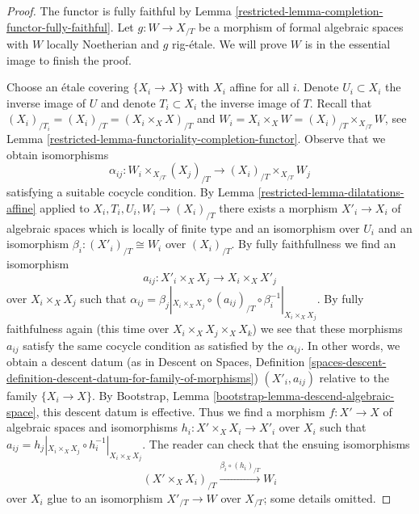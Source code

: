 \begin{proof}

The functor is fully faithful by
Lemma \ref{restricted-lemma-completion-functor-fully-faithful}.
Let $g : W \to X_{/T}$ be a morphism of formal algebraic spaces
with $W$ locally Noetherian and $g$ rig-\'etale.
We will prove $W$ is in the essential image to finish the proof.

\medskip\noindent
Choose an \'etale covering $\{X_i \to X\}$ with $X_i$ affine for all $i$.
Denote $U_i \subset X_i$ the inverse image of $U$ and denote
$T_i \subset X_i$ the inverse image of $T$.
Recall that $(X_i)_{/T_i} = (X_i)_{/T} = (X_i \times_X X)_{/T}$ and
$W_i = X_i \times_X W = (X_i)_{/T} \times_{X_{/T}} W$, see
Lemma \ref{restricted-lemma-functoriality-completion-functor}.
Observe that we obtain isomorphisms
$$
\alpha_{ij} :
W_i \times_{X_{/T}} (X_j)_{/T}
\longrightarrow
(X_i)_{/T} \times_{X_{/T}} W_j
$$
satisfying a suitable cocycle condition.
By Lemma \ref{restricted-lemma-dilatations-affine} applied to
$X_i, T_i, U_i, W_i \to (X_i)_{/T}$
there exists a morphism $X'_i \to X_i$ of algebraic spaces
which is locally of finite type and an isomorphism over $U_i$
and an isomorphism $\beta_i : (X'_i)_{/T} \cong W_i$ over $(X_i)_{/T}$.
By fully faithfullness we find an isomorphism
$$
a_{ij} : X'_i \times_X X_j \longrightarrow X_i \times_X X'_j
$$
over $X_i \times_X X_j$ such that
$\alpha_{ij} = \beta_j|_{X_i \times_X X_j}
\circ (a_{ij})_{/T} \circ \beta_i^{-1}|_{X_i \times_X X_j}$.
By fully faithfulness again (this time over
$X_i \times_X X_j \times_X X_k$)
we see that these morphisms $a_{ij}$ satisfy the same
cocycle condition as satisfied by the $\alpha_{ij}$.
In other words, we obtain a descent datum
(as in Descent on Spaces, Definition
\ref{spaces-descent-definition-descent-datum-for-family-of-morphisms})
$(X'_i, a_{ij})$ relative to the family $\{X_i \to X\}$.
By Bootstrap, Lemma \ref{bootstrap-lemma-descend-algebraic-space},
this descent datum is effective. Thus we find a morphism
$f : X' \to X$ of algebraic spaces and isomorphisms
$h_i : X' \times_X X_i \to X'_i$ over $X_i$ such that
$a_{ij} = h_j|_{X_i \times_X X_j} \circ h_i^{-1}|_{X_i \times_X X_j}$.
The reader can check that the ensuing isomorphisms
$$
(X' \times_X X_i)_{/T}
\xrightarrow{\beta_i \circ (h_i)_{/T}}
W_i
$$
over $X_i$ glue to an isomorphism $X'_{/T} \to W$
over $X_{/T}$; some details omitted.
\end{proof}

